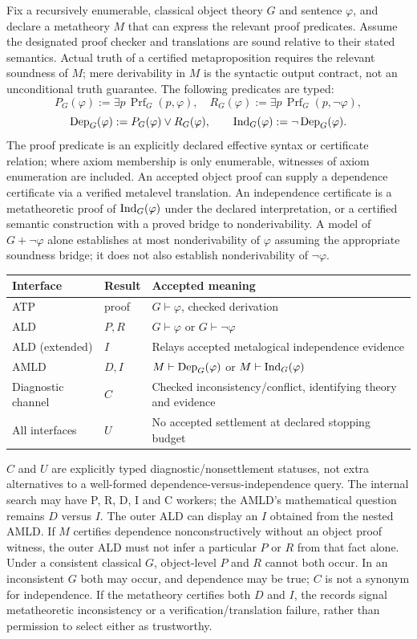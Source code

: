 \documentclass[11pt]{article}
\theoremstyle{definition}\newtheorem{definition}[theorem]{Definition}\newtheorem{example}[theorem]{Example}\newtheorem{conjecture}[theorem]{Conjecture}
\begin{document}
Fix a recursively enumerable, classical object theory $G$ and sentence $\varphi$, and declare a metatheory $M$ that can express the relevant proof predicates. Assume the designated proof checker and translations are sound relative to their stated semantics. Actual truth of a certified metaproposition requires the relevant soundness of $M$; mere derivability in $M$ is the syntactic output contract, not an unconditional truth guarantee. The following predicates are typed:
\[ P_G(\varphi):=\exists p\,\operatorname{Prf}_G(p,\varphi),\quad R_G(\varphi):=\exists p\,\operatorname{Prf}_G(p,\neg\varphi),\]
\[ \operatorname{Dep}_G(\varphi):=P_G(\varphi)\lor R_G(\varphi),\qquad \operatorname{Ind}_G(\varphi):=\neg\operatorname{Dep}_G(\varphi).\]
The proof predicate is an explicitly declared effective syntax or certificate relation; where axiom membership is only enumerable, witnesses of axiom enumeration are included. An accepted object proof can supply a dependence certificate via a verified metalevel translation. An independence certificate is a metatheoretic proof of $\operatorname{Ind}_G(\varphi)$ under the declared interpretation, or a certified semantic construction with a proved bridge to nonderivability. A model of $G+\neg\varphi$ alone establishes at most nonderivability of $\varphi$ assuming the appropriate soundness bridge; it does not also establish nonderivability of $\neg\varphi$.
\begin{center}\small
\begin{tabularx}{\linewidth}{l l X}\toprule
Interface & Result & Accepted meaning\\\midrule
ATP & proof & $G\vdash\varphi$, checked derivation\\
ALD & $P,R$ & $G\vdash\varphi$ or $G\vdash\neg\varphi$\\
ALD (extended) & $I$ & Relays accepted metalogical independence evidence\\
AMLD & $D,I$ & $M\vdash\operatorname{Dep}_G(\varphi)$ or $M\vdash\operatorname{Ind}_G(\varphi)$\\
Diagnostic channel & $C$ & Checked inconsistency/conflict, identifying theory and evidence\\
All interfaces & $U$ & No accepted settlement at declared stopping budget\\\bottomrule
\end{tabularx}\end{center}
$C$ and $U$ are explicitly typed diagnostic/nonsettlement statuses, not extra alternatives to a well-formed dependence-versus-independence query. The internal search may have P, R, D, I and C workers; the AMLD's mathematical question remains $D$ versus $I$. The outer ALD can display an $I$ obtained from the nested AMLD. If $M$ certifies dependence nonconstructively without an object proof witness, the outer ALD must not infer a particular $P$ or $R$ from that fact alone. Under a consistent classical $G$, object-level $P$ and $R$ cannot both occur. In an inconsistent $G$ both may occur, and dependence may be true; $C$ is not a synonym for independence. If the metatheory certifies both $D$ and $I$, the records signal metatheoretic inconsistency or a verification/translation failure, rather than permission to select either as trustworthy.
\end{document}
